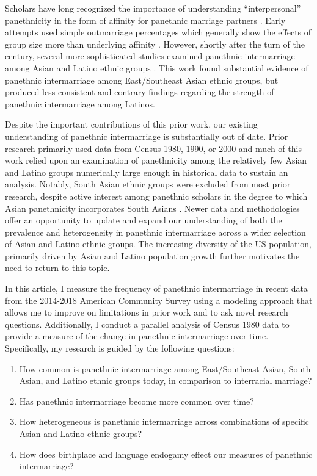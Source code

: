 \documentclass[11pt,]{article}
\providecommand{\tightlist}{%
  \setlength{\itemsep}{0pt}\setlength{\parskip}{0pt}}
\begin{document}
Scholars have long recognized the importance of understanding ``interpersonal'' panethnicity in the form of affinity for panethnic marriage partners \citep[pp.~167-168]{espiritu_asian_1993}. Early attempts used simple outmarriage percentages which generally show the effects of group size more than underlying affinity \citep{shinagawa_asian_1996}. However, shortly after the turn of the century, several more sophisticated studies examined panethnic intermarriage among Asian and Latino ethnic groups \citep{qian_asian_2001, rosenfeld_salience_2001, qian_latinos_2004, fu_how_2007a, qian_crossing_2012}. This work found substantial evidence of panethnic intermarriage among East/Southeast Asian ethnic groups, but produced less consistent and contrary findings regarding the strength of panethnic intermarriage among Latinos.

Despite the important contributions of this prior work, our existing understanding of panethnic intermarriage is substantially out of date. Prior research primarily used data from Census 1980, 1990, or 2000 and much of this work relied upon an examination of panethnicity among the relatively few Asian and Latino groups numerically large enough in historical data to sustain an analysis. Notably, South Asian ethnic groups were excluded from most prior research, despite active interest among panethnic scholars in the degree to which Asian panethnicity incorporates South Asians \citep{kibria_not_1996}. Newer data and methodologies offer an opportunity to update and expand our understanding of both the prevalence and heterogeneity in panethnic intermarriage across a wider selection of Asian and Latino ethnic groups. The increasing diversity of the US population, primarily driven by Asian and Latino population growth further motivates the need to return to this topic.

In this article, I measure the frequency of panethnic intermarriage in recent data from the 2014-2018 American Community Survey using a modeling approach that allows me to improve on limitations in prior work and to ask novel research questions. Additionally, I conduct a parallel analysis of Census 1980 data to provide a measure of the change in panethnic intermarriage over time. Specifically, my research is guided by the following questions:

\begin{enumerate}
\def\labelenumi{\arabic{enumi}.}
\tightlist
\item
  How common is panethnic intermarriage among East/Southeast Asian, South Asian, and Latino ethnic groups today, in comparison to interracial marriage?
\item
  Has panethnic intermarriage become more common over time?
\item
  How heterogeneous is panethnic intermarriage across combinations of specific Asian and Latino ethnic groups?
\item
  How does birthplace and language endogamy effect our measures of panethnic intermarriage?
\end{enumerate}
\end{document}
